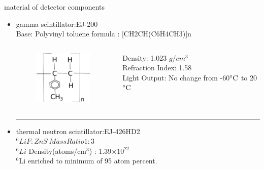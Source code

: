 \documentclass[11pt,compress,xcolor=x11names,UTF8]{beamer}
\begin{document}
\begin{frame}{ material of detector components}
\begin{itemize}
	\item gamma scintillator:EJ-200   \\
		Base: Polyvinyl toluene \quad  formula : [CH2CH(C6H4CH3)]n
\begin{columns}
\begin{column}{.23\textwidth}
\begin{figure}
	\includegraphics[width=0.97\textwidth]{currentfig/Chemical_formula_for_polyvinyl_tolulene.png}
\end{figure}
\end{column}
\begin{column}{.73\textwidth}
	Density: 1.023 $g/cm^3$\\
	Refraction Index: 1.58 \\
	Light Output: No change from -60$\celsius $ to 20 $\celsius$
\end{column}
\end{columns}
	\vspace{.5cm}
	\hrule{\textwidth}
	\vspace{.5cm}

	\item thermal neutron scintillator:EJ-426HD2\\
	$^6LiF:ZnS \ Mass Ratio 1:3$\\
		$^6Li $ Density(atoms/cm$^3$)  : 1.39$\times 10^{22}$\\
		$^6$Li enriched to minimum of 95 atom percent.
\end{itemize}
\end{frame}
\end{document}
